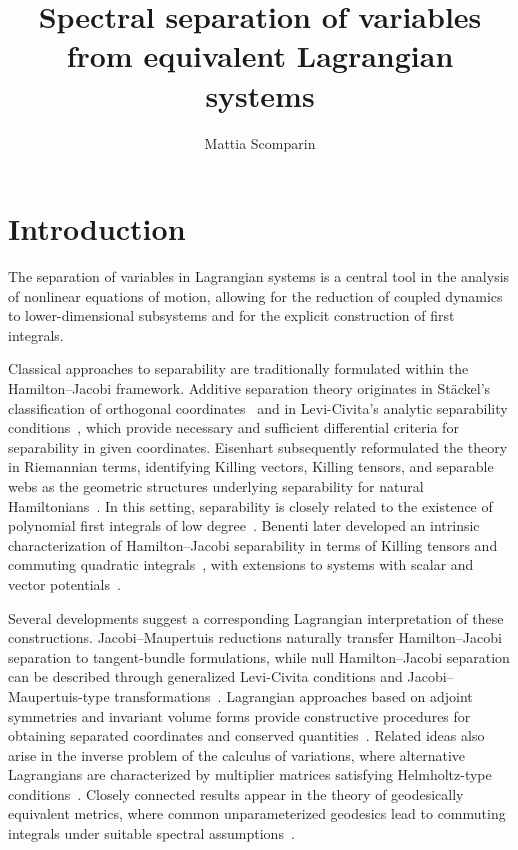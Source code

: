 \documentclass{rendiconti}
\title{Spectral separation of variables from equivalent Lagrangian systems}
\author{Mattia Scomparin}
\begin{document}
\allowbreak
\maketitle


\section{Introduction}
\label{sec:intro}

The separation of variables in Lagrangian systems is a central tool in the analysis of nonlinear equations of motion, allowing for the reduction of coupled dynamics to lower-dimensional subsystems and for the explicit construction of first integrals.

Classical approaches to separability are traditionally formulated within the
Hamilton--Jacobi framework. Additive separation theory originates in
St\"{a}ckel's classification of orthogonal coordinates~\cite{Stackel1893} and in
Levi-Civita's analytic separability conditions~\cite{LeviCivita1904}, which
provide necessary and sufficient differential criteria for separability in
given coordinates. Eisenhart subsequently reformulated the theory in
Riemannian terms, identifying Killing vectors, Killing tensors, and
separable webs as the geometric structures underlying separability for
natural Hamiltonians~\cite{Eisenhart1934}. In this setting, separability is
closely related to the existence of polynomial first integrals of low
degree~\cite{Woodhouse1975,KalninsMiller1980}. Benenti later developed an
intrinsic characterization of Hamilton--Jacobi separability in terms of
Killing tensors and commuting quadratic integrals~\cite{Benenti1997}, with
extensions to systems with scalar and vector
potentials~\cite{BenentiChanuRastelli2001}.

Several developments suggest a corresponding Lagrangian interpretation of
these constructions. Jacobi--Maupertuis reductions naturally transfer
Hamilton--Jacobi separation to tangent-bundle formulations, while null
Hamilton--Jacobi separation can be described through generalized
Levi-Civita conditions and Jacobi--Maupertuis-type
transformations~\cite{BenentiChanuRastelli2005}. Lagrangian approaches based
on adjoint symmetries and invariant volume forms provide constructive
procedures for obtaining separated coordinates and conserved
quantities~\cite{SarletRamos2000}. Related ideas also arise in the inverse
problem of the calculus of variations, where alternative Lagrangians are
characterized by multiplier matrices satisfying Helmholtz-type
conditions~\cite{PrinceSarletThompson2002}. Closely connected results appear
in the theory of geodesically equivalent metrics, where common
unparameterized geodesics lead to commuting integrals under suitable
spectral assumptions~\cite{TopalovMatveev2003}.
\end{document}
